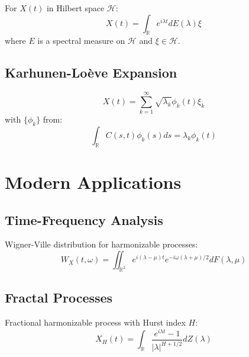 \documentclass[12pt]{article}
\begin{document}
For $X(t)$ in Hilbert space $\mathcal{H}$:
\begin{equation}
X(t) = \int_{\mathbb{R}} e^{i\lambda t} dE(\lambda)\xi
\end{equation}
where $E$ is a spectral measure on $\mathcal{H}$ and $\xi \in \mathcal{H}$.

\subsection{Karhunen-Loève Expansion}

\begin{equation}
X(t) = \sum_{k=1}^\infty \sqrt{\lambda_k} \phi_k(t)\xi_k
\end{equation}
with $\{\phi_k\}$ from:
\begin{equation}
\int_{\mathbb{R}} C(s,t)\phi_k(s)ds = \lambda_k\phi_k(t)
\end{equation}

\section{Modern Applications}

\subsection{Time-Frequency Analysis}

Wigner-Ville distribution for harmonizable processes:
\begin{equation}
W_X(t,\omega) = \iint_{\mathbb{R}^2} e^{i(\lambda - \mu)t} e^{-i\omega(\lambda + \mu)/2} dF(\lambda,\mu)
\end{equation}

\subsection{Fractal Processes}

Fractional harmonizable process with Hurst index $H$:
\begin{equation}
X_H(t) = \int_{\mathbb{R}} \frac{e^{i\lambda t} - 1}{|\lambda|^{H+1/2}} dZ(\lambda)
\end{equation}
\end{document}
